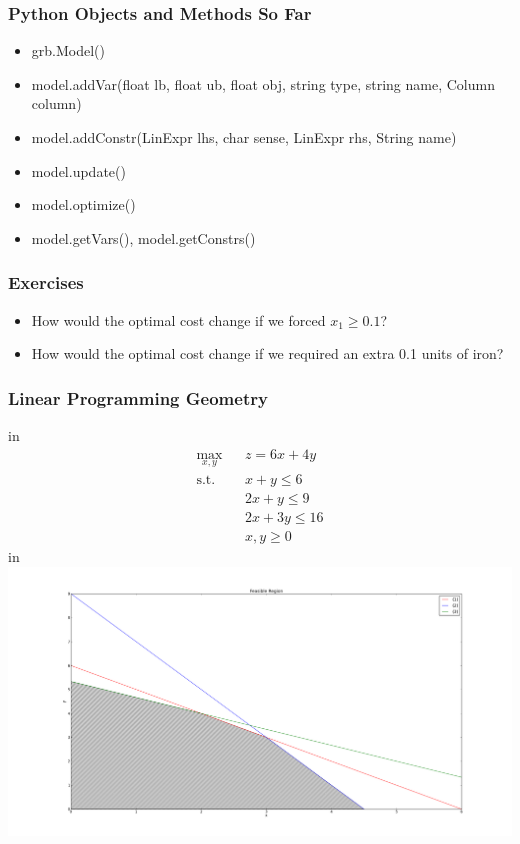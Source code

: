 \documentclass[12pt,handout]{beamer}
\begin{document}
\begin{frame}
\frametitle{Python Objects and Methods So Far}
\begin{itemize}
\item grb.Model()
\item model.addVar(float lb, float ub, float obj, string type, string name, Column column)
\item model.addConstr(LinExpr lhs, char sense, LinExpr rhs, String name)
\item model.update()
\item model.optimize()
\item model.getVars(), model.getConstrs()
\end{itemize}
\end{frame}

{
\begin{frame}
\frametitle{Exercises}
\begin{itemize}
\item How would the optimal cost change if we forced $x_1 \ge 0.1$?
\item How would the optimal cost change if we required an extra 0.1 units of iron?
\end{itemize}
\end{frame}
}

\begin{frame}
\frametitle{Linear Programming Geometry}
 in
\tiny
\begin{eqnarray}
\max_{x,y} && z = 6x + 4y \nonumber \\
\mbox{s.t.} && x + y \le 6 \\
&& 2x + y \le 9 \\
&& 2x + 3y \le 16 \\
&& x, y \ge 0 \nonumber
\end{eqnarray}
 in
\includegraphics[scale=0.2]{feasible_region.png}
\end{frame}
\end{document}
